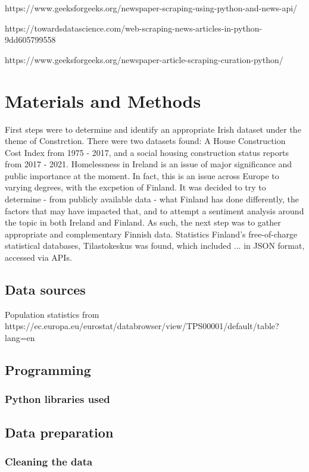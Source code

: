 \documentclass[hidelinks,12pt,oneside]{report} %
\begin{document}
https://www.geeksforgeeks.org/newspaper-scraping-using-python-and-news-api/

https://towardsdatascience.com/web-scraping-news-articles-in-python-9dd605799558

https://www.geeksforgeeks.org/newspaper-article-scraping-curation-python/
\chapter{Materials and Methods}

First steps were to determine and identify an appropriate Irish dataset under the theme of Constrction. There were two datasets found: A House Construction Cost Index from 1975 - 2017, and a social housing construction status reports from 2017 - 2021. Homelessness in Ireland is an issue of major significance and public importance at the moment. In fact, this is an issue across Europe to varying degrees, with the excpetion of Finland. It was decided to try to determine - from publicly available data - what Finland has done differently, the factors that may have impacted that, and to attempt a sentiment analysis around the topic in both Ireland and Finland. As such, the next step was to gather appropriate and complementary Finnish data. Statistics Finland’s free-of-charge statistical databases, Tilastokeskus was found, which included ... in JSON format, accessed via APIs.
 
\section{Data sources}
Population statistics from 
https://ec.europa.eu/eurostat/databrowser/view/TPS00001/default/table?lang=en

\section{Programming}


\subsection{Python libraries used}


\section{Data preparation}
\subsection{Cleaning the data}
\end{document}
